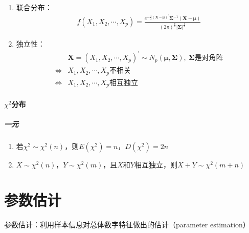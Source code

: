 \documentclass[12pt]{book}
\begin{document}
\begin{enumerate}[1.]
    \item 联合分布：
    \begin{gather*}
        f(X_1,X_2,\cdots,X_p)
        = \frac{ 
            e^{ -\frac{1}{2}(\mathbf{X}-\bm{\mu})^\prime }
            \bm{\Sigma}^{-1}
            (\bm{X}-\bm{\mu})
        }{
            (2\pi)^{\frac{p}{2}}
            \left|\mathbf{\Sigma}\right|^{\frac{1}{2}}
        }
    \end{gather*}
    \item 独立性：
    \begin{align*}
        &\mathbf{X}=(X_1,X_2,\cdots,X_p)^\prime
        \sim N_p(\bm{\mu},\bm{\Sigma}),\ \bm{\Sigma} \text{是对角阵}\\
        \Leftrightarrow &X_1,X_2,\cdots,X_p \text{不相关}\\
        \Leftrightarrow &X_1,X_2,\cdots,X_p \text{相互独立}
    \end{align*}
\end{enumerate}






\subsubsection{$\chi^2$分布}


\paragraph{一元}

\begin{enumerate}[1.]
    \item 若$\chi^2\sim\chi^2(n)$，则$E(\chi^2)=n$，$D(\chi^2)=2n$
    \item $X\sim \chi^2{(n)}$，$Y\sim\chi^2(m)$，且$X$和$Y$相互独立，则$X+Y\sim\chi^2(m+n)$
\end{enumerate}







\chapter{参数估计}

参数估计：利用样本信息对总体数字特征做出的估计（parameter estimation）
\\
\end{document}
